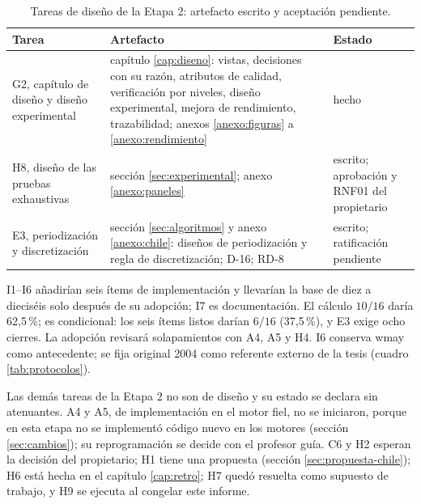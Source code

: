 \begin{table}[H]
\centering
\caption{Tareas de diseño de la Etapa 2: artefacto escrito y aceptación pendiente.}
\label{tab:tareas-diseno}
\footnotesize
\begin{tabular}{L{3.2cm}L{6.0cm}L{3.2cm}}
\toprule
Tarea & Artefacto & Estado \\
\midrule
G2, capítulo de diseño y diseño experimental & capítulo \ref{cap:diseno}: vistas, decisiones
con su razón, atributos de calidad, verificación por niveles, diseño experimental, mejora de
rendimiento, trazabilidad; anexos \ref{anexo:figuras} a \ref{anexo:rendimiento} & hecho \\
\addlinespace
H8, diseño de las pruebas exhaustivas & sección \ref{sec:experimental}; anexo
\ref{anexo:paneles} & escrito; aprobación y RNF01 del propietario \\
\addlinespace
E3, periodización y discretización & sección \ref{sec:algoritmos} y anexo \ref{anexo:chile}:
diseños de periodización y regla de discretización; D-16; RD-8 & escrito; ratificación pendiente \\
\bottomrule
\end{tabular}
\end{table}

I1--I6 añadirían seis ítems de implementación y llevarían la base de diez a dieciséis
solo después de su adopción; I7 es documentación. El cálculo $10/16$ daría 62,5\,\%; es
condicional: los seis ítems listos darían $6/16$ (37,5\,\%), y E3 exige ocho cierres.
La adopción revisará solapamientos con A4, A5 y H4. I6 conserva wmay como antecedente; se fija original
2004 como referente externo de la tesis (cuadro \ref{tab:protocolos}).

Las demás tareas de la Etapa 2 no son de diseño y su estado se declara sin atenuantes. A4 y
A5, de implementación en el motor fiel, no se iniciaron, porque en esta etapa no se
implementó código nuevo en los motores (sección \ref{sec:cambios}); su reprogramación se
decide con el profesor guía. C6 y H2 esperan la decisión del propietario; H1 tiene una
propuesta (sección \ref{sec:propuesta-chile}); H6 está hecha en el capítulo \ref{cap:retro};
H7 quedó resuelta como supuesto de trabajo, y H9 se ejecuta al congelar este informe.
